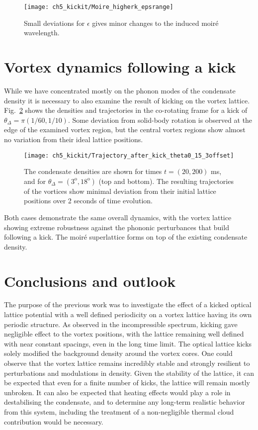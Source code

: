     \begin{figure}
        \centering
        \texttt{[image: ch5\_kickit/Moire\_higherk\_epsrange]}
    	\caption[Moir\'e wavelengths for imperfect lattice alignment.]{Small deviations for $\epsilon$ gives minor changes to the induced moir\'e wavelength.}\label{fig:epsilon}
    \end{figure}


\section{Vortex dynamics following a kick}
While we have concentrated mostly on the phonon modes of the condensate density it is necessary to also examine the result of kicking on the vortex lattice. Fig.~\ref{fig:kickit_traj} shows the densities and trajectories in the co-rotating frame for a kick of $\theta_{\Delta}=\pi (1/60, 1/10)$. Some deviation from solid-body rotation is observed at the edge of the examined vortex region, but the central vortex regions show almost no variation from their ideal lattice positions.
\begin{figure}
    \centering
    \texttt{[image: ch5\_kickit/Trajectory\_after\_kick\_theta0\_15\_3offset]}
	\caption[Vortex densities and trajectories following a kick.]{The condensate densities are shown for times $t=(20,200)$ ms, and for $\theta_\Delta = ( 3^{\textrm{o}},18^{\textrm{o}})$ (top and bottom). The resulting trajectories of the vortices show minimal deviation from their initial lattice positions over 2 seconds of time evolution.}\label{fig:kickit_traj}
\end{figure}

Both cases demonstrate the same overall dynamics, with the vortex lattice showing extreme robustness against the phononic perturbances that build following a kick. The moir\'e superlattice forms on top of the existing condensate density.

\section{Conclusions and outlook}\label{sec:ch5_conc}
The purpose of the previous work was to investigate the effect of a kicked optical lattice potential with a well defined periodicity on a vortex lattice having its own periodic structure. As observed in the incompressible spectrum, kicking gave negligible effect to the vortex positions, with the lattice remaining well defined with near constant spacings, even in the long time limit. The optical lattice kicks solely modified the background density around the vortex cores. One could observe that the vortex lattice remains incredibly stable and strongly resilient to perturbations and modulations in density. Given the stability of the lattice, it can be expected that even for a finite number of kicks, the lattice will remain mostly unbroken. It can also be expected that heating effects would play a role in destabilising the condensate, and to determine any long-term realistic behavior from this system, including the treatment of a non-negligible thermal cloud contribution would be necessary.

